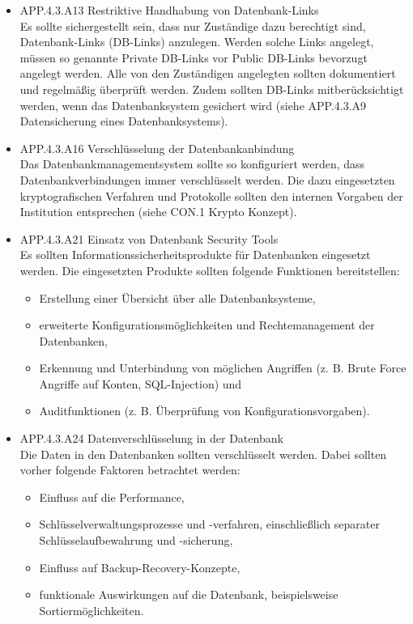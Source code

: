 \begin{itemize}
			\item  APP.4.3.A13 Restriktive Handhabung von Datenbank-Links \\
			Es sollte sichergestellt sein, dass nur Zust\"andige dazu berechtigt sind, Datenbank-Links (DB-Links) anzulegen. Werden solche Links angelegt, m\"ussen so genannte Private DB-Links vor Public DB-Links bevorzugt angelegt werden. Alle von den Zust\"andigen angelegten sollten dokumentiert und regelm\"a{\ss}ig \"uberpr\"uft werden. Zudem sollten DB-Links mitber\"ucksichtigt werden, wenn das Datenbanksystem gesichert wird (siehe APP.4.3.A9 Datensicherung eines Datenbanksystems).\cite{Grundschutz}\\

			\item APP.4.3.A16 Verschl\"usselung der Datenbankanbindung \\
			Das Datenbankmanagementsystem sollte so konfiguriert werden, dass Datenbankverbindungen immer verschl\"usselt werden. Die dazu eingesetzten kryptografischen Verfahren und Protokolle sollten den internen Vorgaben der Institution entsprechen (siehe CON.1 Krypto Konzept).\cite{Grundschutz}\\
			
			\item APP.4.3.A21 Einsatz von Datenbank Security Tools\\
			Es sollten Informationssicherheitsprodukte f\"ur Datenbanken eingesetzt werden. Die eingesetzten Produkte sollten folgende Funktionen bereitstellen:
\begin{itemize}
	\item Erstellung einer \"Ubersicht \"uber alle Datenbanksysteme,
	\item erweiterte Konfigurationsm\"oglichkeiten und Rechtemanagement der Datenbanken,
	\item Erkennung und Unterbindung von m\"oglichen Angriffen (z. B. Brute Force Angriffe auf Konten, SQL-Injection) und
	\item Auditfunktionen (z. B. \"Uberpr\"ufung von Konfigurationsvorgaben).\cite{Grundschutz}\\
\end{itemize}
			
			\item APP.4.3.A24 Datenverschl\"usselung in der Datenbank\\
			Die Daten in den Datenbanken sollten verschl\"usselt werden. Dabei sollten vorher folgende Faktoren betrachtet werden:
\begin{itemize}
	\item Einfluss auf die Performance,
	\item Schl\"usselverwaltungsprozesse und -verfahren, einschlie{\ss}lich separater Schl\"usselaufbewahrung und -sicherung,
	\item Einfluss auf Backup-Recovery-Konzepte,
	\item funktionale Auswirkungen auf die Datenbank, beispielsweise Sortierm\"oglichkeiten.\cite{Grundschutz}\\
\end{itemize}
\end{itemize}


